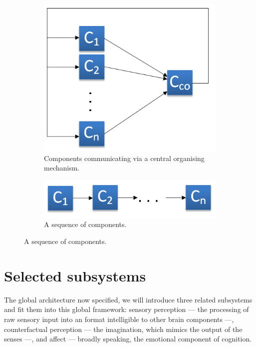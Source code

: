 \documentclass[]{scrartcl}
\theoremstyle{break}
\begin{document}
\begin{figure}
	\centering
	\begin{subfigure}[t]{0.45\textwidth}
		\includegraphics[width=\textwidth]{figs/c_co.png}
		\caption{Components communicating via a central organising mechanism.}
		\label{fig:centralOrganizer}
	\end{subfigure}
	\begin{subfigure}[t]{0.45\textwidth}
		\includegraphics[width=\textwidth]{figs/c_sequence.png}
		\caption{A sequence of components.}
		\label{fig:c_sequence}
	\end{subfigure}
\end{figure}

\section{Selected subsystems}\label{sec:selectedSubsystems}

The global architecture now specified, we will introduce three related subsystems and fit them into this global framework: sensory perception --- the processing of raw sensory input into an format intelligible to other brain components ---, counterfactual perception --- the imagination, which mimics the output of the senses ---, and affect --- broadly speaking, the emotional component of cognition.
\end{document}
